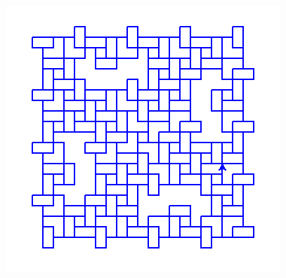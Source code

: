 \documentclass[11pt,class=report,crop=false]{standalone}
\begin{document}
\begin{activite}
\begin{enumerate}
\begin{center}
\includegraphics[scale=\myscale,scale=0.27]{screen-lsystems-6}
\end{center}


\end{enumerate}



\end{activite}



\end{document}
